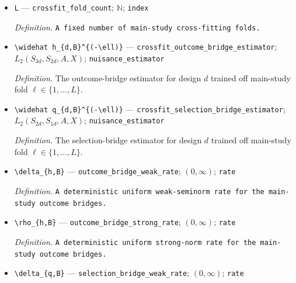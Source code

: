 \documentclass{article}
\begin{document}
\begin{itemize}
  \item \texttt{L} --- \texttt{crossfit\_\allowbreak{}fold\_\allowbreak{}count}; \(\mathbb N\); \texttt{index}
  \par\smallskip\noindent\emph{Definition.} \texttt{A fixed number of main-\allowbreak{}study cross-\allowbreak{}fitting folds.}
  \item \texttt{\textbackslash{}\allowbreak{}widehat h\_\allowbreak{}\{d,\allowbreak{}B\}\allowbreak{}\textasciicircum{}\{(-\allowbreak{}\textbackslash{}\allowbreak{}ell)\}\allowbreak{}} --- \texttt{crossfit\_\allowbreak{}outcome\_\allowbreak{}bridge\_\allowbreak{}estimator}; \(L_2(S_{3d},S_{2d},A,X)\); \texttt{nuisance\_\allowbreak{}estimator}
  \par\smallskip\noindent\emph{Definition.} The outcome-bridge estimator for design \(d\) trained off main-study fold \(\ell\in\{1,\ldots,L\}\).
  \item \texttt{\textbackslash{}\allowbreak{}widehat q\_\allowbreak{}\{d,\allowbreak{}B\}\allowbreak{}\textasciicircum{}\{(-\allowbreak{}\textbackslash{}\allowbreak{}ell)\}\allowbreak{}} --- \texttt{crossfit\_\allowbreak{}selection\_\allowbreak{}bridge\_\allowbreak{}estimator}; \(L_2(S_{2d},S_{1d},A,X)\); \texttt{nuisance\_\allowbreak{}estimator}
  \par\smallskip\noindent\emph{Definition.} The selection-bridge estimator for design \(d\) trained off main-study fold \(\ell\in\{1,\ldots,L\}\).
  \item \texttt{\textbackslash{}\allowbreak{}delta\_\allowbreak{}\{h,\allowbreak{}B\}\allowbreak{}} --- \texttt{outcome\_\allowbreak{}bridge\_\allowbreak{}weak\_\allowbreak{}rate}; \((0,\infty)\); \texttt{rate}
  \par\smallskip\noindent\emph{Definition.} \texttt{A deterministic uniform weak-\allowbreak{}seminorm rate for the main-\allowbreak{}study outcome bridges.}
  \item \texttt{\textbackslash{}\allowbreak{}rho\_\allowbreak{}\{h,\allowbreak{}B\}\allowbreak{}} --- \texttt{outcome\_\allowbreak{}bridge\_\allowbreak{}strong\_\allowbreak{}rate}; \((0,\infty)\); \texttt{rate}
  \par\smallskip\noindent\emph{Definition.} \texttt{A deterministic uniform strong-\allowbreak{}norm rate for the main-\allowbreak{}study outcome bridges.}
  \item \texttt{\textbackslash{}\allowbreak{}delta\_\allowbreak{}\{q,\allowbreak{}B\}\allowbreak{}} --- \texttt{selection\_\allowbreak{}bridge\_\allowbreak{}weak\_\allowbreak{}rate}; \((0,\infty)\); \texttt{rate}

\end{itemize}
\end{document}
